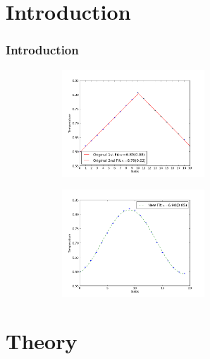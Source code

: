 \documentclass{beamer}
\begin{document}
\section*{Introduction}
\begin{frame}
\frametitle{Introduction}
\begin{figure}
  \begin{subfigure}[b]{.45\linewidth}
    \centering
    \includegraphics[height=4cm]{pf1.png}
  \end{subfigure}\hfill
  \begin{subfigure}[b]{.45\linewidth}
    \centering
    \includegraphics[height=4cm]{pf2.png}
  \end{subfigure}\hfill
\end{figure}
\end{frame}
\section{Theory} %
\end{document}
